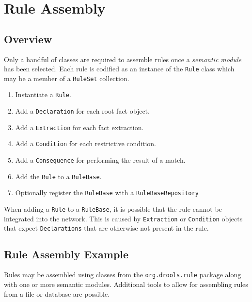 
\chapter{Rule Assembly}

\section{Overview}

Only a handful of classes are required to assemble rules once a
\emph{semantic module} has been selected.  Each rule is codified as an
instance of the \verb|Rule| class which may be a member of a
\verb|RuleSet| collection.  

\begin{enumerate}
	\item Instantiate a \verb|Rule|.
	\item Add a \verb|Declaration| for each root fact object.
	\item Add a \verb|Extraction| for each fact extraction.
	\item Add a \verb|Condition| for each restrictive condition.
	\item Add a \verb|Consequence| for performing the result of a match.
	\item Add the \verb|Rule| to a \verb|RuleBase|.
	\item Optionally register the \verb|RuleBase| with a \verb|RuleBaseRepository|
\end{enumerate}

When adding a \verb|Rule| to a  \verb|RuleBase|, it is possible that
the rule cannot be integrated into the network.  This is caused
by \verb|Extraction| or \verb|Condition| objects that expect
\verb|Declarations| that are otherwise not present in the rule.

\newpage

\section{Rule Assembly Example}

Rules may be assembled using classes from the \verb|org.drools.rule|
package along with one or more semantic modules.  Additional tools
to allow for assembling rules from a file or database are possible.

